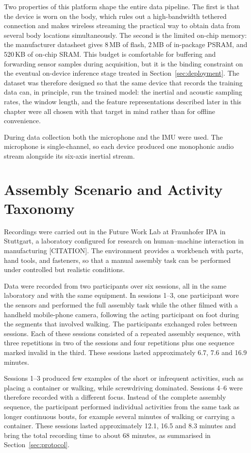 Two properties of this platform shape the entire data pipeline. The first is that
the device is worn on the body, which rules out a high-bandwidth tethered
connection and makes wireless streaming the practical way to obtain data from
several body locations simultaneously. The second is the limited on-chip memory:
the manufacturer datasheet gives 8\,MB of flash, 2\,MB of in-package PSRAM, and
520\,KB of on-chip SRAM. This budget is comfortable for buffering and forwarding sensor samples during
acquisition, but it is the binding constraint on the eventual on-device inference
stage treated in Section~\ref{sec:deployment}. The dataset was therefore
designed so that the same device that records the training data can, in
principle, run the trained model: the inertial and acoustic sampling rates, the
window length, and the feature representations described later in this chapter
were all chosen with that target in mind rather than for offline convenience.

During data collection both the microphone and the IMU were used. The microphone
is single-channel, so each device produced one monophonic audio stream alongside
its six-axis inertial stream.

\section{Assembly Scenario and Activity Taxonomy}
\label{sec:taxonomy}

Recordings were carried out in the Future Work Lab at Fraunhofer IPA in Stuttgart,
a laboratory configured for research on human--machine interaction in
manufacturing {[}CITATION{]}.
The environment provides a workbench with parts, hand tools, and fasteners, so
that a manual assembly task can be performed under controlled but realistic
conditions.

Data were recorded from two participants over six sessions, all in the same
laboratory and with the same equipment. In sessions 1--3, one participant wore the
sensors and performed the full assembly task while the other filmed with a
handheld mobile-phone camera, following the acting participant on foot during the
segments that involved walking. The participants exchanged roles between sessions.
Each of these sessions consisted of a repeated assembly sequence, with three
repetitions in two of the sessions and four repetitions plus one sequence marked
invalid in the third. These sessions lasted approximately 6.7, 7.6 and
16.9 minutes.

Sessions 1--3 produced few examples of the short or infrequent activities, such
as placing a container or walking, while screwdriving dominated. Sessions 4--6
were therefore recorded with a different focus. Instead of the complete assembly
sequence, the participant performed individual activities from the same task as
longer continuous bouts, for example several minutes of walking or carrying a
container. These sessions lasted approximately 12.1, 16.5 and 8.3 minutes and
bring the total recording time to about 68 minutes, as summarised in
Section~\ref{sec:protocol}.

